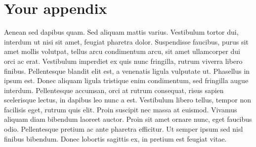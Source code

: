 \appendix
\chapter{Your appendix}\label{apx:morestuff}
Aenean sed dapibus quam. 
Sed aliquam mattis varius. 
Vestibulum tortor dui, interdum ut nisi sit amet, feugiat pharetra dolor. 
Suspendisse faucibus, purus sit amet mollis volutpat, tellus arcu condimentum arcu, sit amet ullamcorper dui orci ac erat. 
Vestibulum imperdiet ex quis nunc fringilla, rutrum viverra libero finibus. 
Pellentesque blandit elit est, a venenatis ligula vulputate ut. 
Phasellus in ipsum est. Donec aliquam ligula tristique enim condimentum, sed fringilla augue interdum. 
Pellentesque accumsan, orci at rutrum consequat, risus sapien scelerisque lectus, in dapibus leo nunc a est. Vestibulum libero tellus, tempor non facilisis eget, rutrum quis elit.
Proin suscipit nec massa at euismod. Vivamus aliquam diam bibendum laoreet auctor.
Proin sit amet ornare nunc, eget faucibus odio. 
Pellentesque pretium ac ante pharetra efficitur. 
Ut semper ipsum sed nisl finibus bibendum. Donec lobortis sagittis ex, in pretium est feugiat vitae. 

